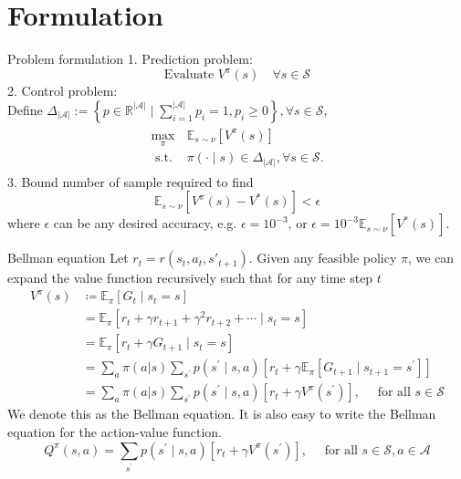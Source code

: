\documentclass[handout]{beamer}
\begin{document}
\section{Formulation}
\begin{frame}{Problem formulation}
    \small
    1. Prediction problem:
    \begin{equation*}
        \text{Evaluate } V^{\pi}(s) \quad \forall s\in \mathcal{S}
    \end{equation*}
    2. Control problem:\\
    Define $\Delta_{|\mathcal{A}|}:=\left\{p \in \mathbb{R}^{|\mathcal{A}|} \mid \sum_{i=1}^{|\mathcal{A}|} p_{i}=1, p_{i} \geq 0\right\}, \forall s \in \mathcal{S}$,
    \begin{equation*}
        \begin{aligned}
        \begin{array}{ll}
        \max_{\pi} & \mathbb{E}_{s \sim \nu}\left[V^{\pi}(s)\right] \\
        \text { s.t. } & \pi(\cdot \mid s) \in \Delta_{|\mathcal{A}|}, \forall s \in \mathcal{S} .
        \end{array}
        \end{aligned}
    \end{equation*}
    3. Bound number of sample required to find 
    \begin{equation*}
        \mathbb{E}_{s \sim \nu}\left[V^{\pi}(s)-V^*(s)\right] < \epsilon
    \end{equation*}
    where $\epsilon$ can be any desired accuracy, e.g. $\epsilon = 10^{-3}$, or $\epsilon = 10^{-3} \mathbb{E}_{s \sim \nu}\left[V^*(s)\right]$.
\end{frame}

\begin{frame}{Bellman equation}
    \small
    Let $r_t = r(s_t, a_t, s'_{t+1})$. Given any feasible policy $\pi$, we can expand the value function recursively such that for any time step $t$
    \begin{equation}
    \begin{aligned}
    V^{\pi}(s) & \coloneqq \mathbb{E}_{\pi}\left[G_{t} \mid s_{t}=s\right] \\
    &=\mathbb{E}_{\pi}\left[r_{t}+\gamma r_{t+1} + \gamma^2 r_{t+2} + \cdots \mid s_{t}=s\right] \\
    &=\mathbb{E}_{\pi}\left[r_{t}+\gamma G_{t+1} \mid s_{t}=s\right] \\
    &=\sum_{a} \pi(a | s) \sum_{s^{\prime}} p\left(s^{\prime} \mid s, a\right)\left[r_t +\gamma \mathbb{E}_{\pi}\left[G_{t+1} \mid s_{t+1}=s^{\prime}\right]\right] \\
    &=\sum_{a} \pi(a | s) \sum_{s^{\prime}} p\left(s^{\prime}\mid s, a\right)\left[r_t +\gamma V^{\pi}\left(s^{\prime}\right)\right], \quad \text { for all } s \in \mathcal{S}
\end{aligned}
\end{equation}
We denote this as the Bellman equation. It is also easy to write the Bellman equation for the action-value function.
$$
Q^{\pi}(s,a) = \sum_{s^{\prime}} p\left(s^{\prime}\mid s, a\right)\left[r_t +\gamma V^{\pi}\left(s^{\prime}\right)\right], \quad \text { for all } s \in \mathcal{S}, a\in \mathcal{A}
$$
\end{frame}
\end{document}
